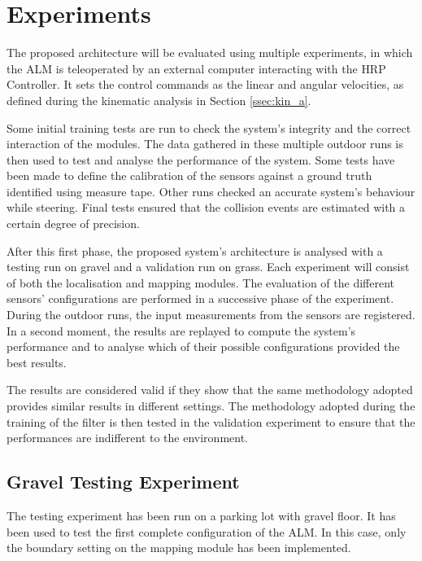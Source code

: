 \section{Experiments}
\noindent The proposed architecture will be evaluated using multiple experiments, in which the \gls{ALM} is teleoperated by an external computer interacting with the \gls{HRP} Controller.
It sets the control commands as the linear and angular velocities, as defined during the kinematic analysis in Section \ref{ssec:kin_a}.

Some initial training tests are run to check the system's integrity and the correct interaction of the modules.
The data gathered in these multiple outdoor runs is then used to test and analyse the performance of the system.
Some tests have been made to define the calibration of the sensors against a ground truth identified using measure tape.
Other runs checked an accurate system's behaviour while steering.
Final tests ensured that the collision events are estimated with a certain degree of precision.

After this first phase, the proposed system's architecture is analysed with a testing run on gravel and a validation run on grass.
Each experiment will consist of both the localisation and mapping modules.
The evaluation of the different sensors' configurations are performed in a successive phase of the experiment.
During the outdoor runs, the input measurements from the sensors are registered.
In a second moment, the results are replayed to compute the system's performance and to analyse which of their possible configurations provided the best results.

The results are considered valid if they show that the same methodology adopted provides similar results in different settings.
The methodology adopted during the training of the filter is then tested in the validation experiment to ensure that the performances are indifferent to the environment.


\subsection{Gravel Testing Experiment}
\noindent
The testing experiment has been run on a parking lot with gravel floor.
It has been used to test the first complete configuration of the \gls{ALM}.
In this case, only the boundary setting on the mapping module has been implemented.

